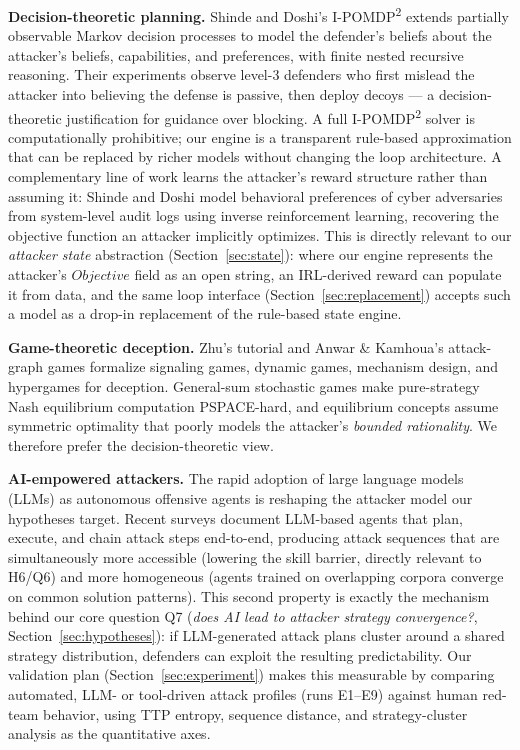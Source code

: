 \documentclass[preprints,article,accept,oneauthor]{Definitions/mdpi}
\begin{document}
\textbf{Decision-theoretic planning.} Shinde and Doshi's
I-POMDP\textsuperscript{2} \citep{shinde-doshi} extends partially observable
Markov decision processes to model the defender's beliefs about the
attacker's beliefs, capabilities, and preferences, with finite nested
recursive reasoning. Their experiments observe level-3 defenders who first
mislead the attacker into believing the defense is passive, then deploy
decoys --- a decision-theoretic justification for guidance over blocking. A
full I-POMDP\textsuperscript{2} solver is computationally prohibitive; our
engine is a transparent rule-based approximation that can be replaced by
richer models without changing the loop architecture. A complementary line
of work learns the attacker's reward structure rather than assuming it:
Shinde and Doshi \citep{irl-adversary} model behavioral preferences of cyber
adversaries from system-level audit logs using inverse reinforcement
learning, recovering the objective function an attacker implicitly
optimizes. This is directly relevant to our \textit{attacker state}
abstraction (Section~\ref{sec:state}): where our engine represents the
attacker's $\mathit{Objective}$ field as an open string, an IRL-derived
reward can populate it from data, and the same loop interface
(Section~\ref{sec:replacement}) accepts such a model as a drop-in
replacement of the rule-based state engine.

\textbf{Game-theoretic deception.} Zhu's tutorial \citep{zhu} and Anwar \&
Kamhoua's attack-graph games \citep{anwar-kamhoua} formalize signaling games,
dynamic games, mechanism design, and hypergames for deception. General-sum
stochastic games make pure-strategy Nash equilibrium computation
PSPACE-hard, and equilibrium concepts assume symmetric optimality that
poorly models the attacker's \textit{bounded rationality}. We therefore
prefer the decision-theoretic view.

\textbf{AI-empowered attackers.} The rapid adoption of large language models
(LLMs) as autonomous offensive agents is reshaping the attacker model our
hypotheses target. Recent surveys \citep{llm-attack-agents} document
LLM-based agents that plan, execute, and chain attack steps end-to-end,
producing attack sequences that are simultaneously more accessible (lowering
the skill barrier, directly relevant to H6/Q6) and more homogeneous (agents
trained on overlapping corpora converge on common solution patterns). This
second property is exactly the mechanism behind our core question Q7
(\textit{does AI lead to attacker strategy convergence?},
Section~\ref{sec:hypotheses}): if LLM-generated attack plans cluster around
a shared strategy distribution, defenders can exploit the resulting
predictability. Our validation plan (Section~\ref{sec:experiment}) makes
this measurable by comparing automated, LLM- or tool-driven attack profiles
(runs E1--E9) against human red-team behavior, using TTP entropy, sequence
distance, and strategy-cluster analysis as the quantitative axes.
\end{document}
